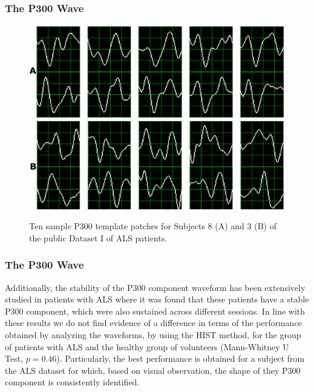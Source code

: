 \documentclass[aspectratio=169]{beamer}
\begin{document}
\begin{frame}
\frametitle{The P300 Wave}
\begin{center}
\begin{figure}[h!]
\centering
\includegraphics[width=15cm]{images/subject.png}\label{subject8}
\caption[Sample P300 Patches]{Ten sample P300 template patches for Subjects 8 (A) and 3 (B) of the public Dataset I of ALS patients.}  %
\label{fig:p300templates}
\end{figure}
\end{center}
\end{frame} 

\begin{frame}
\frametitle{The P300 Wave}
\begin{center}
Additionally, the stability of the P300 component waveform has been extensively studied in patients with ALS \cite{SellersandEmanuelDonchin2006,TomohiroMadarame2008,Nijboer2009,Mak2012,McCane2015} where it was found that these patients have a stable P300 component, which were also sustained across different sessions.  In line with these results we do not find evidence of a difference in terms of the performance obtained by analyzing the waveforms, by using the HIST method, for the group of patients with ALS and the healthy group of volunteers (Mann-Whitney U Test, $p=0.46$). Particularly, the best performance is obtained for a subject from the ALS dataset for which, based on visual observation, the shape of they P300 component is consistently identified.
\end{center}
\end{frame} 
    
\end{document}
